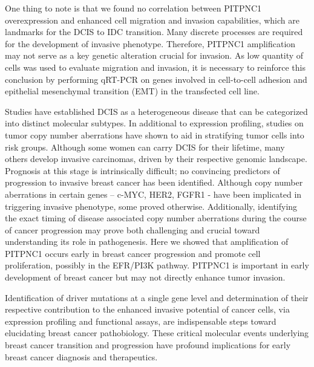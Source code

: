 \documentclass[10pt,letterpaper]{article}
\begin{document}
One thing to note is that we found no correlation between PITPNC1 overexpression and enhanced cell migration and invasion capabilities, which are landmarks for the DCIS to IDC transition. Many discrete processes are required for the development of invasive phenotype. Therefore, PITPNC1 amplification may not serve as a key genetic alteration crucial for invasion. As low quantity of cells was used to evaluate migration and invasion, it is necessary to reinforce this conclusion by performing qRT-PCR on genes involved in cell-to-cell adhesion and epithelial mesenchymal transition (EMT) in the transfected cell line.

Studies have established DCIS as a heterogeneous disease that can be categorized into distinct molecular subtypes. \cite{6_clark_warwick_carpenter_bowen_duffy_jones_2010} In additional to expression profiling, studies on tumor copy number aberrations have shown to aid in stratifying tumor cells into risk groups. \cite{19_wood_parsons_jones_lin_sjoblom_leary_shen_boca_barber_ptak,20_koboldt_fulton_mclellan_schmidt_kalicki-veizer_mcmichael_fulton_dooling_ding_mardis} Although some women can carry DCIS for their lifetime, many others develop invasive carcinomas, driven by their respective genomic landscape. Prognosis at this stage is intrinsically difficult; no convincing predictors of progression to invasive breast cancer has been identified. Although copy number aberrations in certain genes – c-MYC, HER2, FGFR1 - have been implicated in triggering invasive phenotype, \cite{14_cowell_weigelt_sakr_ng_hicks_king_reis-filho_2013} some proved otherwise. \cite{5_latta_tjan_parkes_omalley_2002} Additionally, identifying the exact timing of disease associated copy number aberrations during the course of cancer progression may prove both challenging and crucial toward understanding its role in pathogenesis. \cite{7_corzo_corominas_tusquets_salido_bellet_fabregat_serrano_sol_2006,8_robanus-maandag_bosch_kristel_hart_faneyte_nederlof_peterse_van} Here we showed that amplification of PITPNC1 occurs early in breast cancer progression and promote cell proliferation, possibly in the EFR/PI3K pathway. PITPNC1 is important in early development of breast cancer but may not directly enhance tumor invasion.

Identification of driver mutations at a single gene level and determination of their respective contribution to the enhanced invasive potential of cancer cells, via expression profiling and functional assays, are indispensable steps toward elucidating breast cancer pathobiology. These critical molecular events underlying breast cancer transition and progression have profound implications for early breast cancer diagnosis and therapeutics.

\medskip
\printbibliography
\end{document}
